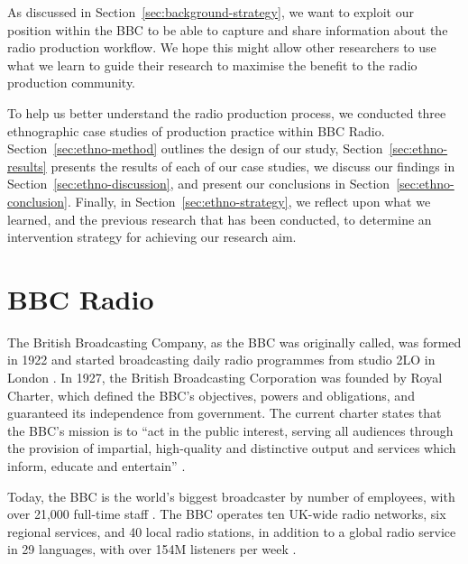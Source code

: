 
As discussed in Section~\ref{sec:background-strategy}, we want to exploit our position within the BBC to be able to
capture and share information about the radio production workflow. We hope this might allow other researchers to use
what we learn to guide their research to maximise the benefit to the radio production community.


To help us better understand the radio production process, we conducted three ethnographic case studies of production
practice within BBC Radio.  Section~\ref{sec:ethno-method} outlines the design of our study,
Section~\ref{sec:ethno-results} presents the results of each of our case studies, we discuss our findings in
Section~\ref{sec:ethno-discussion}, and present our conclusions in Section~\ref{sec:ethno-conclusion}.  Finally, in
Section~\ref{sec:ethno-strategy}, we reflect upon what we learned, and the previous research that has been conducted,
to determine an intervention strategy for achieving our research aim.

\section{BBC Radio}

The British Broadcasting Company, as the BBC was originally called, was formed in 1922 and started broadcasting daily
radio programmes from studio 2LO in London \citep{BBC2015}. In 1927, the British Broadcasting Corporation was founded
by Royal Charter, which defined the BBC's objectives, powers and obligations, and guaranteed its independence from
government.  The current charter states that the BBC's mission is to ``act in the public interest, serving all
audiences through the provision of impartial, high-quality and distinctive output and services which inform, educate
and entertain'' \citep{BBCCharter2016}.

Today, the BBC is the world's biggest broadcaster by number of employees, with over 21,000 full-time staff
\citep[p.~56]{BBC2017a}. The BBC operates ten UK-wide radio networks, six regional services, and 40 local radio
stations, in addition to a global radio service in 29 languages, with over 154M listeners per week \citep[pp.~4,
32]{BBC2017a}.

